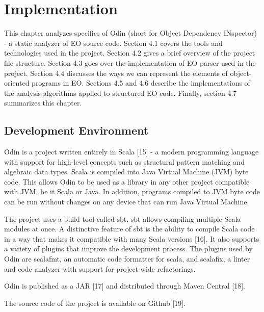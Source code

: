 \chapter{Implementation}
\label{chap:impl}
This chapter analyzes specifics of Odin (short for Object Dependency INspector) - a static analyzer of EO source code. Section 4.1 covers the tools and technologies used in the project. Section 4.2 gives a brief overview of the project file structure.
Section 4.3 goes over the implementation of EO parser used in the project. Section 4.4 discusses the ways we can represent the elements of object-oriented programs in EO. Sections 4.5 and 4.6 describe the implementations of the analysis algorithms applied to structured EO code. Finally, section 4.7 summarizes this chapter.

\section{Development Environment}
Odin is a project written entirely in Scala [15] - a modern programming language with support for high-level concepts such as structural pattern matching and algebraic data types. Scala is compiled into Java Virtual Machine (JVM) byte code. This allows Odin to be used as a library in any other project compatible with JVM, be it Scala or Java. In addition, programs compiled to JVM byte code can be run without changes on any device that can run Java Virtual Machine.


The project uses a build tool called sbt. sbt allows compiling multiple Scala modules at once. A distinctive feature of sbt is the ability to compile Scala code in a way that makes it compatible with many Scala versions [16]. It also supports a variety of plugins that improve the development process. The plugins used by Odin are scalafmt, an automatic code formatter for scala, and scalafix, a linter and code analyzer with support for project-wide refactorings.

Odin is published as a JAR [17] and distributed through Maven Central [18].

The source code of the project is available on Github [19].



